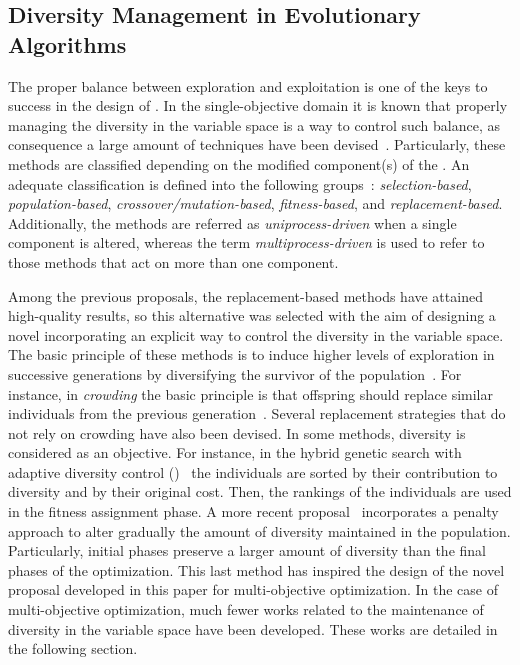 

\subsection{Diversity Management in Evolutionary Algorithms}

The proper balance between exploration and exploitation is one of the keys to success in the design of \EAS{}.
%
In the single-objective domain it is known that properly managing the diversity in the variable space is a way to control such balance,
as consequence a large amount of techniques have been devised~\cite{Mohan:14}.
%
Particularly, these methods are classified depending on the modified component(s) of the \EA{}.
%
An adequate classification is defined into the following groups~\cite{Joel:Crepinsek}: \textit{selection-based}, \textit{population-based}, 
\textit{crossover/mutation-based}, \textit{fitness-based}, and \textit{replacement-based}.
%
Additionally, the methods are referred as \textit{uniprocess-driven} when a single component is altered, whereas the term
\textit{multiprocess-driven} is used to refer to those methods that act on more than one component.

Among the previous proposals, the replacement-based methods have attained high-quality results, so
this alternative was selected with the aim of designing a novel \MOEA{} incorporating an explicit way to control the diversity 
in the variable space.
%
The basic principle of these methods is to induce higher levels of exploration in successive generations by diversifying 
the survivor of the population~\cite{Segura:17}.
%
For instance, in \textit{crowding} the basic principle is that offspring should replace similar individuals from the previous generation~\cite{Mengshoel:14}.
%
Several replacement strategies that do not rely on crowding have also been devised.
%
In some methods, diversity is considered as an objective.
%
For instance, in the hybrid genetic search with adaptive diversity control (\HGSADC{})~\cite{Vidal:13} the individuals are sorted by their contribution to diversity and by their original cost.
%
Then, the rankings of the individuals are used in the fitness assignment phase.
%
A more recent proposal~\cite{Segura:17} incorporates a penalty approach to alter gradually the amount of diversity maintained in the population.
%
Particularly, initial phases preserve a larger amount of diversity than the final phases of the optimization.
%
This last method has inspired the design of the novel proposal developed in this paper for multi-objective optimization.
%
In the case of multi-objective optimization, much fewer works related to the maintenance of diversity in the variable space
have been developed.
%
These works are detailed in the following section.

